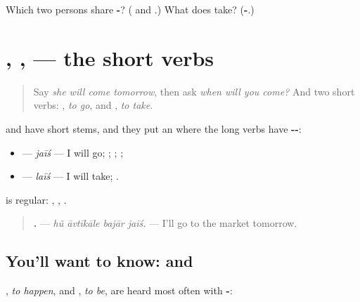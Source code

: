\begin{tcolorbox}[breakable,colback=teal!4,colframe=teal!35!black,title={Before you move on}]
Which two persons share \textbf{-}? (\textbf{} and \textbf{}.) What does \textbf{} take? (\textbf{-}.)
\end{tcolorbox}
\section[\texorpdfstring{\gu{જઈશ} · \gu{લઈશ} · \gu{થશે} … (jaīś · laīś …)}{જઈશ · લઈશ · થશે … (jaīś · laīś …)}]{, ,  — the short verbs}

\label{lesson:GU-C149-jaish}



\begin{quote}
Say \emph{she will come tomorrow}, then ask \emph{when will you come?} And two short verbs: \textbf{}, \emph{to go}, and \textbf{}, \emph{to take}.
\end{quote}

\begin{grammarlens}[title={Grammar Lens: \gu{જવું}, \gu{લેવું}, \gu{કરવું}}]
\textbf{} and \textbf{} have short stems, and they put an \textbf{} where the long verbs have \textbf{--}:

\begin{itemize}
\raggedright
  \item \textbf{ } — \emph{jaīś} — I will go; \textbf{ }; \textbf{ }; \textbf{ };
  \item \textbf{ } — \emph{laīś} — I will take; \textbf{ }.
\end{itemize}

\textbf{} is regular: \textbf{ }, \textbf{ }, \textbf{ }.

\begin{quote}
\textbf{   .} — \emph{hũ āvtīkāle bajār jaīś.} — I'll go to the market tomorrow.
\end{quote}
\end{grammarlens}

\subsection*{You'll want to know:  and }
\textbf{}, \emph{to happen}, and \textbf{}, \emph{to be}, are heard most often with \textbf{-}:

